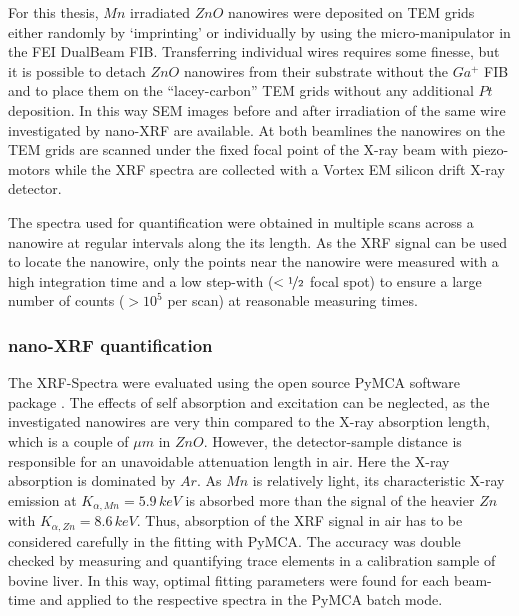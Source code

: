 For this thesis, $Mn$ irradiated $ZnO$ nanowires were deposited on TEM grids either randomly by `imprinting' or individually by using the micro-manipulator in the FEI DualBeam FIB. Transferring individual wires requires some finesse, but it is possible to detach $ZnO$ nanowires from their substrate without the $Ga^+$ FIB and to place them on the ``lacey-carbon'' TEM grids without any additional $Pt$ deposition. In this way SEM images before and after irradiation of the same wire investigated by nano-XRF are available. At both beamlines the nanowires on the TEM grids are scanned under the fixed focal point of the X-ray beam with piezo-motors while the XRF spectra are collected with a Vortex EM silicon drift X-ray detector.

The spectra used for quantification were obtained in multiple scans across a nanowire at regular intervals along the its length. As the XRF signal can be used to locate the nanowire, only the points near the nanowire were measured with a high integration time and a low step-with ($< \nicefrac{1}{2}$ focal spot) to ensure a large number of counts ($> 10^5$ per scan) at reasonable measuring times.

\vfill
\subsubsection{nano-XRF quantification}

The XRF-Spectra were evaluated using the open source PyMCA software package \cite{sole_multiplatform_2007}. The effects of self absorption and excitation can be neglected, as the investigated nanowires are very thin compared to the X-ray absorption length, which is a couple of $\mu m$ in $ZnO$. However, the detector-sample distance is responsible for an unavoidable attenuation length in air. Here the X-ray absorption is dominated by $Ar$. As $Mn$ is relatively light, its characteristic X-ray emission at $K_{\alpha,Mn} = 5.9\,keV$ is absorbed more than the signal of the heavier $Zn$ with $K_{\alpha,Zn} = 8.6\,keV$. Thus, absorption of the XRF signal in air has to be considered carefully in the fitting with PyMCA. The accuracy was double checked by measuring and quantifying trace elements in a calibration sample of bovine liver. In this way, optimal fitting parameters were found for each beam-time and applied to the respective spectra in the PyMCA batch mode. 

